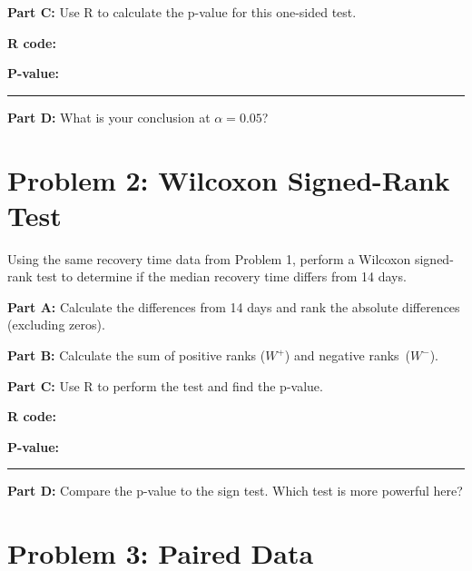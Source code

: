 \documentclass[11pt]{article}
\begin{document}
\textbf{Part C:} Use R to calculate the p-value for this one-sided test.

\textbf{R code:}

\vspace{2.5cm}

\textbf{P-value:} \rule{3cm}{0.4pt}

\vspace{0.3cm}

\textbf{Part D:} What is your conclusion at $\alpha = 0.05$?

\vspace{2cm}

\newpage

\section{Problem 2: Wilcoxon Signed-Rank Test}

Using the same recovery time data from Problem 1, perform a Wilcoxon signed-rank test to determine if the median recovery time differs from 14 days.

\vspace{6pt}

\textbf{Part A:} Calculate the differences from 14 days and rank the absolute differences (excluding zeros).

\vspace{2cm}

\textbf{Part B:} Calculate the sum of positive ranks ($W^+$) and negative ranks~($W^-$).

\vspace{2cm}

\textbf{Part C:} Use R to perform the test and find the p-value.

\textbf{R code:}

\vspace{2.5cm}

\textbf{P-value:} \rule{3cm}{0.4pt}

\vspace{0.3cm}

\textbf{Part D:} Compare the p-value to the sign test. Which test is more powerful here?

\vspace{2cm}

\newpage

\section{Problem 3: Paired Data}
\end{document}
